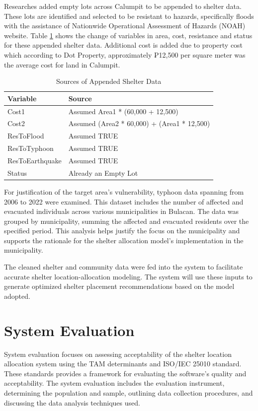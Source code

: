 	Researches added empty lots across Calumpit to be appended to shelter data. These lots are identified and selected to be resistant to hazards, specifically floods with the assistance of Nationwide Operational Assessment of Hazards (NOAH) website. Table \ref{AppendData} shows the change of variables in area, cost, resistance and status for these appended shelter data. Additional cost is added due to property cost which according to Dot Property, approximately ₱12,500 per square meter was the average cost for land in Calumpit.
	
	\begin{table}[h]
		\centering
		\caption{Sources of Appended Shelter Data}
		\label{AppendData}
		\renewcommand{\arraystretch}{1.3}
		\begin{tabularx}{\textwidth}{>{\raggedright\arraybackslash}p{4cm} X}
			\hline
			\textbf{Variable} & \textbf{Source} \\ \hline
			Cost1            & Assumed Area1 * (60,000 + 12,500) \\ 
			Cost2            & Assumed (Area2 * 60,000) + (Area1 * 12,500) \\ 
			ResToFlood       & Assumed TRUE \\ 
			ResToTyphoon     & Assumed TRUE \\ 
			ResToEarthquake  & Assumed TRUE \\ 
			Status           & Already an Empty Lot \\ \hline
		\end{tabularx}
	\end{table}
	
	For justification of the target area’s vulnerability, typhoon data spanning from 2006 to 2022 were examined. This dataset includes the number of affected and evacuated individuals across various municipalities in Bulacan. The data was grouped by municipality, summing the affected and evacuated residents over the specified period. This analysis helps justify the focus on the municipality and supports the rationale for the shelter allocation model’s implementation in the municipality.
	
	The cleaned shelter and community data were fed into the system to facilitate accurate shelter location-allocation modeling. The system will use these inputs to generate optimized shelter placement recommendations based on the model adopted.
	
	
\section{System Evaluation}
	System evaluation focuses on assessing acceptability of the shelter location allocation system using the TAM determinants and ISO/IEC 25010 standard. These standards provides a framework for evaluating the software's quality and acceptability. The system evaluation includes the evaluation instrument, determining the population and sample, outlining data collection procedures, and discussing the data analysis techniques used.

